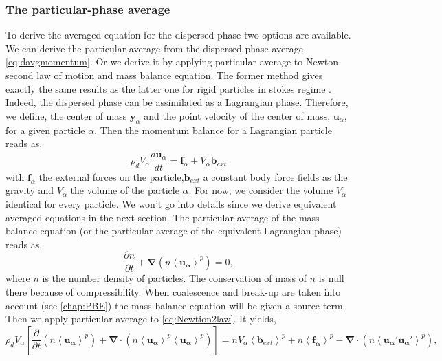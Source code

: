 \subsubsection{The particular-phase average} 
To derive the averaged equation for the dispersed phase two options are available.
We can derive the particular average from the dispersed-phase average \ref{eq:davgmomentum}. 
Or we derive it by applying particular average to Newton second law of motion and mass balance equation. 
The former method gives exactly the same results as the latter one for rigid particles in stokes regime \citep{nott2011suspension}. 
Indeed, the dispersed phase can be assimilated as a Lagrangian phase. 
Therefore, we define, the center of mass $\bm{y}_\alpha$ and the point velocity of the center of mass, $\textbf{u}_\alpha$, for a given particle $\alpha$.
Then the momentum balance for a Lagrangian particle reads as, 
\begin{equation}
    \label{eq:Newtion2law}
    \rho_d V_\alpha \frac{d\textbf{u}_\alpha}{dt} = \bm{f}_\alpha + V_\alpha \bm{b}_{ext}
\end{equation}
with $\bm{f}_\alpha$ the external forces on the particle,$\bm{b}_{ext}$ a constant body force fields as the gravity and $V_\alpha$ the volume of the particle $\alpha$. 
For now, we consider the volume $V_\alpha$ identical for every particle. 
We won't go into details since we derive equivalent averaged equations in the next section.
The particular-average of the mass balance equation (or the particular average of the equivalent Lagrangian phase) reads as,
\begin{equation}
    \label{eq:pavgMASS}
    \frac{\partial n}{\partial t} + \bm{\nabla}\left(n\left<\bm{u_\alpha}\right>^p\right) = 0,
\end{equation} 
where $n$ is the number density of particles.
The conservation of mass of $n$ is null there because of compressibility. 
When coalescence and break-up are taken into account (see \ref{chap:PBE}) the mass balance equation will be given a source term. 
Then we apply particular average to \ref{eq:Newtion2law}.
It yields, 
\begin{equation}
    \label{eq:pavgsp}
    \rho_d V_\alpha \left[\frac{\partial }{\partial t}(n\left<\bm{u_\alpha}\right>^p) 
    + \bm{\nabla}\cdot(n\left<\bm{u_\alpha}\right>^p\left<\bm{u_\alpha}\right>^p)\right] 
    = n V_\alpha \left<\bm{b}_{ext}\right>^p 
    + n\left<\bm{f_\alpha}\right>^p 
    - \bm{\nabla}\cdot(n\left<\bm{u_\alpha'u_\alpha'}\right>^p),
\end{equation} 
